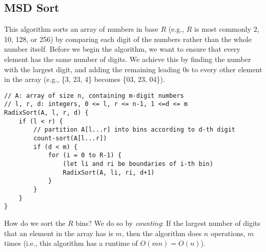 \documentclass{report}
\begin{document}
\subsection{MSD Sort}
This algorithm sorts an array of numbers in base $R$ (e.g., $R$ is most commonly 2, 10, 128, or 256) by comparing each digit of the numbers rather than the whole number itself. Before we begin the algorithm, we want to ensure that every element has the same number of digits. We achieve this by finding the number with the largest digit, and adding the remaining leading 0s to every other element in the array (e.g., \{3, 23, 4\} becomes \{03, 23, 04\}).
\begin{lstlisting}
// A: array of size n, containing m-digit numbers
// l, r, d: integers, 0 <= l, r <= n-1, 1 <=d <= m
RadixSort(A, l, r, d) {
	if (l < r) {
		// partition A[l...r] into bins according to d-th digit
		count-sort(A[l...r])
		if (d < m) {
			for (i = 0 to R-1) {
				(let li and ri be boundaries of i-th bin)
				RadixSort(A, li, ri, d+1)
			}
		}
	}
}
\end{lstlisting}
How do we sort the $R$ bins? We do so by \textit{counting}:
If the largest number of digits that an element in the array has is $m$, then the algorithm does $n$ operations, $m$ times (i.e., this algorithm has a runtime of $O(mn) = O(n)$).
\end{document}
